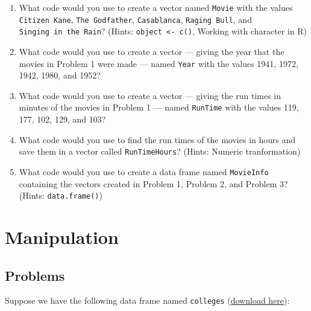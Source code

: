 \documentclass[
]{book}
\providecommand{\tightlist}{%
  \setlength{\itemsep}{0pt}\setlength{\parskip}{0pt}}
\begin{document}
\begin{enumerate}
\def\labelenumi{\arabic{enumi}.}
\tightlist
\item
  What code would you use to create a vector named \texttt{Movie} with the values \texttt{Citizen\ Kane}, \texttt{The\ Godfather}, \texttt{Casablanca}, \texttt{Raging\ Bull}, and \texttt{Singing\ in\ the\ Rain}? (Hints: \texttt{object\ \textless{}-\ c()}, Working with character in R)
\item
  What code would you use to create a vector --- giving the year that the movies in Problem 1 were made --- named \texttt{Year} with the values 1941, 1972, 1942, 1980, and 1952?
\item
  What code would you use to create a vector --- giving the run times in minutes of the movies in Problem 1 --- named \texttt{RunTime} with the values 119, 177, 102, 129, and 103?
\item
  What code would you use to find the run times of the movies in hours and save them in a vector called \texttt{RunTimeHours}? (Hints: Numeric tranformation)
\item
  What code would you use to create a data frame named \texttt{MovieInfo} containing the vectors created in Problem 1, Problem 2, and Problem 3? (Hints: \texttt{data.frame()})
\end{enumerate}

\hypertarget{manipulation}{%
\section{Manipulation}\label{manipulation}}

\hypertarget{problems-1}{%
\subsection{Problems}\label{problems-1}}

Suppose we have the following data frame named \texttt{colleges} (\href{data/colleges.xlsx}{download here}):
\end{document}
